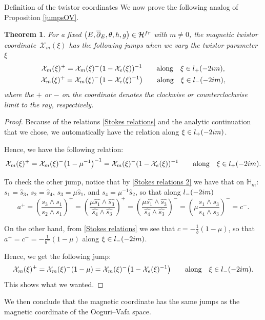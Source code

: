 \documentclass[11pt]{article}
\numberwithin{equation}{section}
\newtheorem{Theorem}{Theorem}[section]
\numberwithin{equation}{section}
\begin{document}
\begin{subsubsection} {Definition of the twistor coordinates}
We now prove the following analog of Proposition \ref{jumpsOV}.

\begin{Theorem} For a fixed $\bigl(E,\overline{\partial}_E,\theta,h,g\bigr) \in \mathcal{H}^{{\rm fr}}$ with $m\neq 0$, the magnetic twistor coordinate~$\mathcal{X}_m(\xi)$ has the following jumps when we vary the twistor parameter $\xi$
\begin{gather*}
 \mathcal{X}_m(\xi)^{+}=\mathcal{X}_m(\xi)^{-}(1-\mathcal{X}_e(\xi))^{-1} \qquad \text{along} \quad \xi \in l_{+}(-2{\rm i}m),\\
 \mathcal{X}_m(\xi)^{+}=\mathcal{X}_m(\xi)^{-}\bigl(1-\mathcal{X}_e(\xi)^{-1}\bigr) \qquad \text{along} \quad \xi \in l_{-}(-2{\rm i}m),
\end{gather*}
where the $+$ or $-$ on the coordinate denotes the clockwise or counterclockwise limit to the ray, respectively.
\end{Theorem}

\begin{proof}
Because of the relations \eqref{Stokes relations} and the analytic continuation that we chose, we automatically have the relation
 along $ \xi \in l_+(-2{\rm i}m)$.

Hence, we have the following relation:
\begin{equation*}
 \mathcal{X}_m(\xi)^{+}=\mathcal{X}_m(\xi)^{-}\bigl(1-\mu^{-1}\bigr)^{-1}=\mathcal{X}_m(\xi)^{-}(1-\mathcal{X}_e(\xi))^{-1} \qquad \text{along} \quad \xi \in l_{+}(-2{\rm i}m).
\end{equation*}

To check the other jump, notice that by \eqref{Stokes relations 2} we have that on $\mathbb{H}_m$: $s_1=\widehat{s}_3$, $s_2=\widehat{s}_4$, $s_3=\mu \widehat{s}_1$, and $s_4=\mu^{-1} \widehat{s}_2$, so that along $l_-(-2{\rm i}m)$
\begin{equation*}
 a^{+}=\left(\frac{s_3\wedge s_1}{s_2\wedge s_1}\right)^{+}
 = \left(\frac{\mu \widehat{s_1}\wedge \widehat{s_3}}{\widehat{s_4}\wedge \widehat{s_3}}\right)^{+}=\left(\frac{\mu \widehat{s_1}\wedge \widehat{s_3}}{\widehat{s_4}\wedge \widehat{s_3}}\right)^{-}=\left(\mu \frac{s_1\wedge s_3}{s_4\wedge s_3}\right)^{-}=c^-.
\end{equation*}

On the other hand, from \eqref{Stokes relations} we see that
$
 c=-\frac{1}{b}(1-\mu)$,
so that
$
 a^{+}=c^-=-\frac{1}{b^-}(1-\mu)$ along $\xi \in l_-(-2{\rm i}m)$.

Hence, we get the following jump:
\begin{equation*}
 \mathcal{X}_m(\xi)^{+}=\mathcal{X}_m(\xi)^{-}(1-\mu)=\mathcal{X}_m(\xi)^{-}\bigl(1-\mathcal{X}_e(\xi)^{-1}\bigr) \qquad \text{along} \quad \xi \in l_{-}(-2{\rm i}m).
\end{equation*}
This shows what we wanted.
\end{proof}

We then conclude that the magnetic coordinate has the same jumps as the magnetic coordinate of the Ooguri--Vafa space.

\end{subsubsection}
\end{document}
